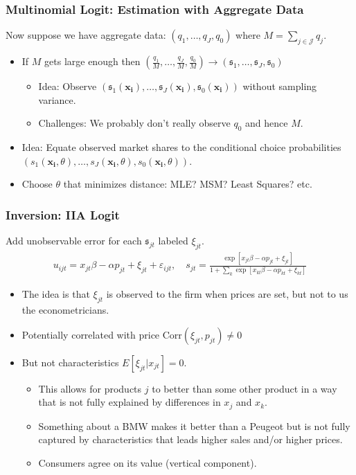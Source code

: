 \begin{frame}
\frametitle{Multinomial Logit: Estimation with Aggregate Data}
Now suppose we have aggregate data: $(q_1,\ldots,q_J,q_0)$ where $M = \sum_{j \in \mathcal{J}} q_j$.
\begin{itemize}
\item If $M$ gets large enough then $(\frac{q_1}{M},\ldots,\frac{q_J}{M},\frac{q_0}{M})\rightarrow (\mathfrak{s}_1,\ldots,\mathfrak{s}_J,\mathfrak{s}_0)$
\begin{itemize}
\item Idea: Observe $(\mathfrak{s}_1(\mathbf{x_i}),\ldots,\mathfrak{s}_J(\mathbf{x_i}), \mathfrak{s}_0(\mathbf{x_i}))$ without sampling variance.
\item  Challenges: We probably don't really observe $q_0$ and hence $M$.
\end{itemize}
\item Idea: Equate observed market shares to the conditional choice probabilities $(s_1(\mathbf{x_i},\theta),\ldots,s_J(\mathbf{x_i},\theta),s_0(\mathbf{x_i},\theta))$.
\item Choose $\theta$ that minimizes distance: MLE? MSM? Least Squares? etc.
\end{itemize}
\end{frame}

\begin{frame}
\frametitle{Inversion: IIA Logit}
Add unobservable error for each $\mathfrak{s}_{jt}$ labeled $\xi_{jt}$.
\begin{align*}
u_{ijt} = x_{jt} \beta -\alpha p_{jt} + \xi_{jt} +  \varepsilon_{ijt} , \quad 
s_{jt} = \frac{\exp[x_{jt} \beta -\alpha p_{jt} + \xi_{jt} ]}{1+\sum_k \exp[x_{kt} \beta -\alpha p_{kt}  + \xi_{kt} ]} 
\end{align*}
\begin{itemize}
\item The idea is that $\xi_{jt}$ is observed to the firm when prices are set, but not to us the econometricians.
\item Potentially correlated with price $\text{Corr}(\xi_{jt},p_{jt}) \neq 0$
\item But not characteristics $E[\xi_{jt} | x_{jt}]=0$.
\begin{itemize}
\item This allows for products $j$ to better than some other product in a way that is not fully explained by differences in $x_j$ and $x_k$.
\item Something about a BMW makes it better than a Peugeot but is not fully captured by characteristics that leads higher sales and/or higher prices.
\item Consumers agree on its value  (\alert{vertical component}).
\end{itemize}
\end{itemize}
\end{frame}

